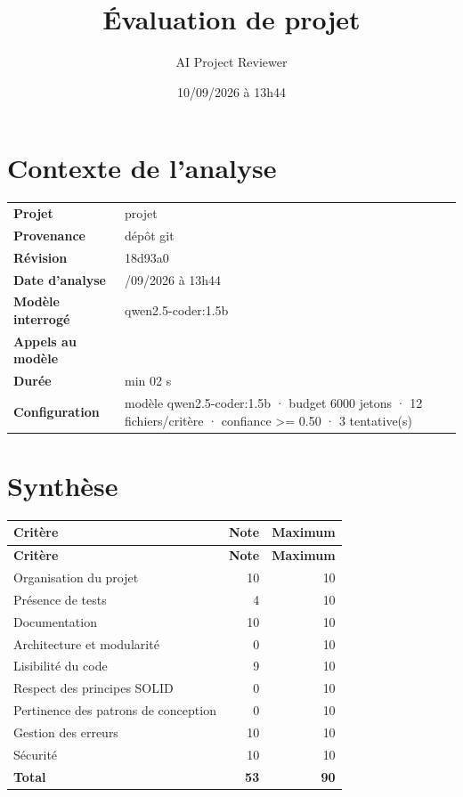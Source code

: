 \documentclass[11pt,a4paper]{article}
\title{Évaluation de projet}
\date{10/09/2026 à 13h44}
\author{AI Project Reviewer}
\begin{document}
\maketitle

\section*{Contexte de l'analyse}
\begin{tabular}{@{}l>{\raggedright\arraybackslash}p{}@{}}
\textbf{Projet} & projet \\
\textbf{Provenance} & dépôt git \\
\textbf{Révision} & 18d93a0 \\
\textbf{Date d'analyse} & 10/09/2026 à 13h44 \\
\textbf{Modèle interrogé} & qwen2.5-coder:1.5b \\
\textbf{Appels au modèle} & 6 \\
\textbf{Durée} & 1 min 02 s \\
\textbf{Configuration} & modèle qwen2.5-coder:1.5b · budget 6000 jetons · 12 fichiers/critère · confiance >= 0.50 · 3 tentative(s) \\
\end{tabular}

\section*{Synthèse}
\begin{longtable}{@{}lrr@{}}
\hline
\textbf{Critère} & \textbf{Note} & \textbf{Maximum} \\
\hline
\endfirsthead
\hline
\textbf{Critère} & \textbf{Note} & \textbf{Maximum} \\
\hline
\endhead
Organisation du projet & 10 & 10 \\
Présence de tests & 4 & 10 \\
Documentation & 10 & 10 \\
Architecture et modularité & 0 & 10 \\
Lisibilité du code & 9 & 10 \\
Respect des principes SOLID & 0 & 10 \\
Pertinence des patrons de conception & 0 & 10 \\
Gestion des erreurs & 10 & 10 \\
Sécurité & 10 & 10 \\
\hline
\textbf{Total} & \textbf{53} & \textbf{90} \\
\hline
\end{longtable}
\end{document}
